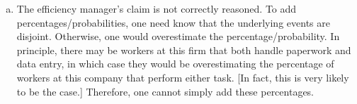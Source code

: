 \documentclass[12pt,letterpaper]{exam}
\begin{document}
\begin{questions}
{\begin{enumerate}[(a)]
\item The efficiency manager's claim is not correctly reasoned. To add percentages/probabilities, one need know that the underlying events are disjoint. Otherwise, one would overestimate the percentage/probability. In principle, there may be workers at this firm that both handle paperwork and data entry, in which case they would be overestimating the percentage of workers at this company that perform either task. [In fact, this is very likely to be the case.] Therefore, one cannot simply add these percentages. 
\end{enumerate}
}


\end{questions}
\end{document}
